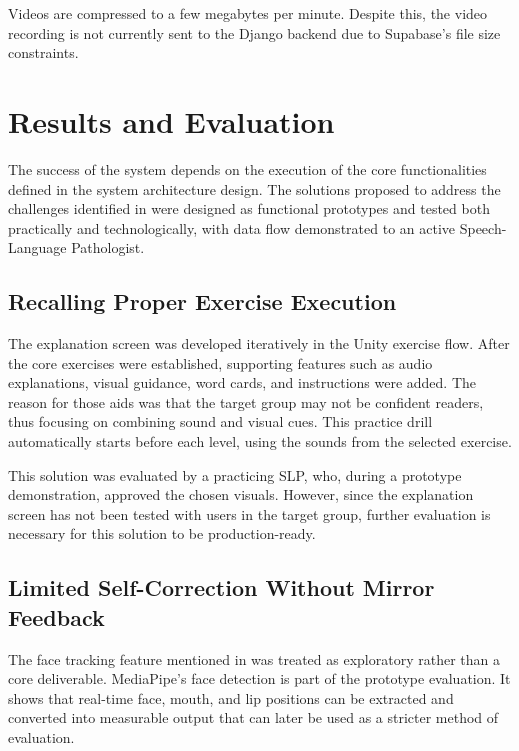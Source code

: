 Videos are compressed to a few megabytes per minute. Despite this, the video recording is not currently sent to the Django backend due to Supabase's file size constraints.

\section{Results and Evaluation}
\label{sec:results-evaluation}

The success of the system depends on the execution of the core functionalities defined in the system architecture design. The solutions proposed to address the challenges identified in  were designed as functional prototypes and tested both practically and technologically, with data flow demonstrated to an active Speech-Language Pathologist.

\subsection{Recalling Proper Exercise Execution}
\label{subsec:recalling-proper-exercise-execution}

The explanation screen was developed iteratively in the Unity exercise flow. After the core exercises were established, supporting features such as audio explanations, visual guidance, word cards, and instructions were added. The reason for those aids was that the target group may not be confident readers, thus focusing on combining sound and visual cues. This practice drill automatically starts before each level, using the sounds from the selected exercise.

This solution was evaluated by a practicing SLP, who, during a prototype demonstration, approved the chosen visuals. However, since the explanation screen has not been tested with users in the target group, further evaluation is necessary for this solution to be production-ready.

\subsection{Limited Self-Correction Without Mirror Feedback}
\label{subsec:limited-self-correction-without-mirror-feedback}

The face tracking feature mentioned in  was treated as exploratory rather than a core deliverable. MediaPipe's face detection is part of the prototype evaluation. It shows that real-time face, mouth, and lip positions can be extracted and converted into measurable output that can later be used as a stricter method of evaluation.

